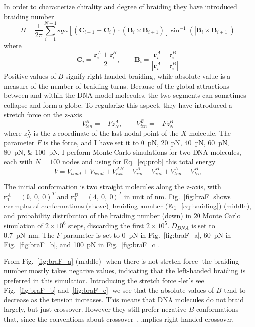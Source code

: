 \documentclass[a4paper,10pt]{article}
\begin{document}
In order to characterize chirality and degree of braiding they have introduced braiding number
\begin{equation}\label{eq:braiding}
B=\dfrac{1}{2\pi}\sum_{i=1}^{N-1}sgn\left [\left (\textbf{C}_{i+1}-\textbf{C}_{i}\right )\cdot\left (\textbf{B}_{i}\times\textbf{B}_{i+1}\right )\right ]\sin^{-1}\left (\left |\textbf{B}_{i}\times\textbf{B}_{i+1}\right |\right )
\end{equation}
where
\begin{equation}
\textbf{C}_{i}=\dfrac{\textbf{r}_{i}^{A}+\textbf{r}_{i}^{B}}{2},\qquad \textbf{B}_{i}=\dfrac{\textbf{r}_{i}^{A}-\textbf{r}_{i}^{B}}{\left |\textbf{r}_{i}^{A}-\textbf{r}_{i}^{B}\right |}
\end{equation}
Positive values of $B$ signify right-handed braiding, while absolute value is a measure of the number of braiding turns.
Because of the global attractions between and within the DNA model molecules, the two segments can sometimes collapse and form a globe.
To regularize this aspect, they have introduced a stretch force on the z-axis
\begin{equation}\label{eq:ten}
V_{ten}^{A}=-Fz_{N}^{A},\qquad V_{ten}^{B}=-Fz_{N}^{B}
\end{equation}
where $z_{N}^{X}$ is the z-coordinate of the last nodal point of the $X$ molecule.
The parameter $F$ is the force, and I have set it to \SIlist{0; 20; 40; 60; 80; 100}{\pico\newton}.
I perform Monte Carlo simulations for two DNA molecules, each with $N=100$ nodes and using for Eq.~\ref{eq:prob} this total energy
\begin{equation}\label{eq:bra_energy}
V=V_{bond}+V_{bend}+V_{ext}^{AB}+V_{int}^{A}+V_{int}^{B}+V_{ten}^{A}+V_{ten}^{B}
\end{equation}

The initial conformation is two straight molecules along the z-axis, with $\textbf{r}_{1}^{A}=\left (0,\ 0,\ 0\right )^T$ and $\textbf{r}_{1}^{B}=\left (4,\ 0,\ 0\right )^T$ in unit of \si{\nm}.
Fig.~\ref{fig:braF} shows examples of conformations (above), braiding number (Eq.~\ref{eq:braiding}) (middle), and probability distribution of the braiding number (down) in $20$ Monte Carlo simulation of $2\times 10^6$ steps, discarding the first $2\times 10^5$.
$D_{DNA}$ is set to \SI{0.7}{\pico\newton\nano\meter}.
The $F$ parameter is set to \SI{0}{\pico\newton} in Fig.~\ref{fig:braF_a}, \SI{60}{\pico\newton} in Fig.~\ref{fig:braF_b}, and \SI{100}{\pico\newton} in Fig.~\ref{fig:braF_c}.

From Fig.~\ref{fig:braF_a} (middle) -when there is not stretch force- the braiding number mostly takes negative values, indicating that the left-handed braiding is preferred in this simulation.
Introducing the stretch force -let's see Fig.~\ref{fig:braF_b} and~\ref{fig:braF_c}- we see that the absolute values of $B$ tend to decrease as the tension increases.
This means that DNA molecules do not braid largely, but just crossover.
However they still prefer negative $B$ conformations that, since the conventions about crossover~\cite{br_1}, implies right-handed crossover.
\end{document}
